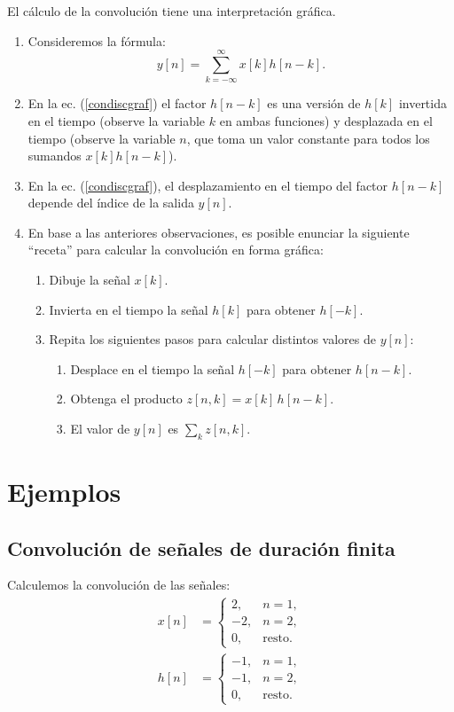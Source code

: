 \documentclass[11pt,a4paper,openany]{book}
\begin{document}
El cálculo de la convolución tiene una interpretación gráfica.
\begin{enumerate}
	\item Consideremos la fórmula:
	\begin{equation}
		y[n] = \sum_{k=-\infty}^{\infty} x[k] h[n-k].
		\label{condiscgraf}
	\end{equation}
	
	\item En la ec. (\ref{condiscgraf}) el factor $h[n-k]$ es una versión de $h[k]$ invertida en el tiempo (observe la variable $k$ en ambas funciones) y desplazada en el tiempo (observe la variable $n$, que toma un valor constante para todos los sumandos $x[k] h[n-k]$).
	\item En la ec. (\ref{condiscgraf}), el desplazamiento en el tiempo del factor $h[n-k]$ depende del índice de la salida $y[n]$.
	\item En base a las anteriores observaciones, es posible enunciar la siguiente ``receta'' para calcular la convolución en forma gráfica:
	\begin{enumerate}
		\item Dibuje la señal $x[k]$.
		\item Invierta en el tiempo la señal $h[k]$ para obtener $h[-k]$.
		\item Repita los siguientes pasos para calcular distintos valores de $y[n]$:
		\begin{enumerate}
			\item Desplace en el tiempo la señal $h[-k]$ para obtener $h[n-k]$.
			\item Obtenga el producto $z[n,k] = x[k] \, h[n-k]$.
			\item El valor de $y[n]$ es $\sum_{k} z[n,k]$.
		\end{enumerate}
	\end{enumerate}
\end{enumerate}

\section{Ejemplos}

\subsection{Convolución de señales de duración finita}

Calculemos la convolución de las señales:
\begin{align}
	x[n] &= \begin{cases}
		2, & n=1, \\ 
		-2, & n=2, \\ 
		0, & \text{resto}.
	\end{cases} \\ 
	h[n] &= \begin{cases}
		-1, & n=1, \\ 
		-1, & n=2, \\ 
		0, & \text{resto}.
	\end{cases}
\end{align}
\end{document}
